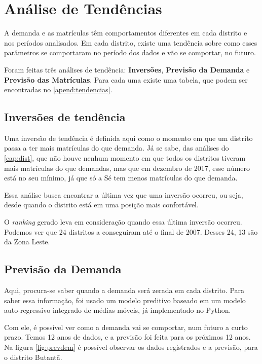 \chapter{Análise de Tendências}
\label{cap:tendencias}

\lettrine{A}{} demanda e as matrículas têm comportamentos diferentes em cada distrito e nos períodos analisados. Em cada distrito, existe uma tendência sobre como esses parâmetros se comportaram no período dos dados e vão se comportar, no futuro.

Foram feitas três análises de tendência: \textbf{Inversões}, \textbf{Previsão da Demanda} e \textbf{Previsão das Matrículas}. Para cada uma existe uma tabela, que podem ser encontradas no \autoref{apend:tendencias}.

\section{Inversões de tendência}

Uma inversão de tendência é definida aqui como o momento em que um distrito passa a ter mais matrículas do que demanda. Já se sabe, das análises do \autoref{cap:dist}, que não houve nenhum momento em que todos os distritos tiveram mais matrículas do que demandas, mas que em dezembro de 2017, esse número está no seu mínimo, já que só a Sé tem menos matrículas do que demanda.

Essa análise busca encontrar a última vez que uma inversão ocorreu, ou seja, desde quando o distrito está em uma posição mais confortável.

O \textit{ranking} gerado leva em consideração quando essa última inversão ocorreu. Podemos ver que 24 distritos a conseguiram até o final de 2007. Desses 24, 13 são da Zona Leste.

\section{Previsão da Demanda}

Aqui, procura-se saber quando a demanda será zerada em cada distrito. Para saber essa informação, foi usado um modelo preditivo baseado em um modelo auto-regressivo integrado de médias móveis, já implementado no Python.

Com ele, é possível ver como a demanda vai se comportar, num futuro a curto prazo. Temos 12 anos de dados, e a previsão foi feita para os próximos 12 anos. Na figura \autoref{fig:prevdem} é possível observar os dados registrados e a previsão, para o distrito Butantã.

